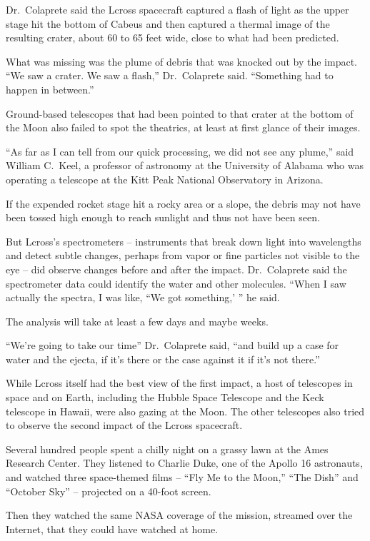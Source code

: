 ﻿\documentclass[12pt]{article}
\begin{document}
Dr.~Colaprete said the Lcross spacecraft captured a flash of light as the upper stage hit the bottom
of Cabeus and then captured a thermal image of the resulting crater, about 60 to 65 feet wide, close
to what had been predicted.

What was missing was the plume of debris that was knocked out by the impact. ``We saw a crater. We
saw a flash,'' Dr.~Colaprete said. ``Something had to happen in between.''

Ground-based telescopes that had been pointed to that crater at the bottom of the Moon also failed
to spot the theatrics, at least at first glance of their images.

``As far as I can tell from our quick processing, we did not see any plume,'' said William C.~Keel,
a professor of astronomy at the University of Alabama who was operating a telescope at the Kitt Peak
National Observatory in Arizona.

If the expended rocket stage hit a rocky area or a slope, the debris may not have been tossed high
enough to reach sunlight and thus not have been seen.

But Lcross's spectrometers -- instruments that break down light into wavelengths and detect subtle
changes, perhaps from vapor or fine particles not visible to the eye -- did observe changes before
and after the impact. Dr.~Colaprete said the spectrometer data could identify the water and other
molecules. ``When I saw actually the spectra, I was like, ``We got something,' '' he said.

The analysis will take at least a few days and maybe weeks.

``We're going to take our time'' Dr.~Colaprete said, ``and build up a case for water and the ejecta,
if it's there or the case against it if it's not there.''

While Lcross itself had the best view of the first impact, a host of telescopes in space and on
Earth, including the Hubble Space Telescope and the Keck telescope in Hawaii, were also gazing at
the Moon. The other telescopes also tried to observe the second impact of the Lcross spacecraft.

Several hundred people spent a chilly night on a grassy lawn at the Ames Research Center. They
listened to Charlie Duke, one of the Apollo 16 astronauts, and watched three space-themed films --
``Fly Me to the Moon,'' ``The Dish'' and ``October Sky'' -- projected on a 40-foot screen.

Then they watched the same NASA coverage of the mission, streamed over the Internet, that they could
have watched at home.
\end{document}
